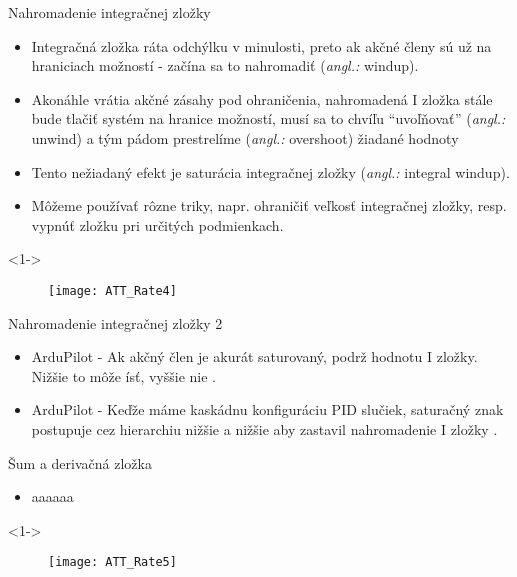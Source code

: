 \documentclass{beamer}
\newcommand{\angl}[1]{{\color{gray}(\emph{angl.:} #1)}}
\begin{document}
\begin{frame}[t]{Nahromadenie integračnej zložky}
  \begin{itemize}
    \item<1-> Integračná zložka ráta odchýlku v minulosti, preto ak akčné členy sú už na hraniciach možností - začína sa to nahromadiť \angl{windup}.
    \item<2-> Akonáhle vrátia akčné zásahy pod ohraničenia, nahromadená I zložka stále bude tlačiť systém na hranice možností, musí sa to chvíľu ``uvoľňovať'' \angl{unwind} a tým pádom prestrelíme \angl{overshoot} žiadané hodnoty
    \item<3-> Tento nežiadaný efekt je saturácia integračnej zložky \angl{integral windup}.
    \item<4-> Môžeme používať rôzne triky, napr. ohraničiť veľkosť integračnej zložky, resp. vypnúť zložku pri určitých podmienkach.
  \end{itemize}
      \begin{onlyenv}<1->
  \begin{figure}
\centering
  \texttt{[image: ATT\_Rate4]}\\
\end{figure}
\end{onlyenv}

\end{frame}

\begin{frame}[t]{Nahromadenie integračnej zložky 2}
  \begin{itemize}
  \item<1-> ArduPilot - Ak akčný člen je akurát saturovaný, podrž hodnotu I zložky. Nižšie to môže ísť, vyššie nie \citep{AP:PID}.
  \item<2-> ArduPilot - Keďže máme kaskádnu konfiguráciu PID slučiek, saturačný znak postupuje cez hierarchiu nižšie a nižšie aby zastavil nahromadenie I zložky \citep{AP:PID}.
  \end{itemize}
\end{frame}

\begin{frame}[t]{Šum a derivačná zložka}
  \begin{itemize}
    \item<1-> aaaaaa
  \end{itemize}
      \begin{onlyenv}<1->
  \begin{figure}
\centering
  \texttt{[image: ATT\_Rate5]}\\
\end{figure}
\end{onlyenv}

\end{frame}
\end{document}
